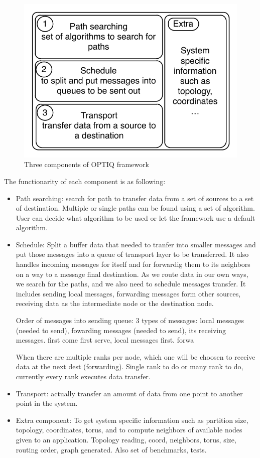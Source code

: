 \begin{figure}[!htb]
\vspace{-0.1in}
\centering
\includegraphics[scale=0.7]{figures/framework.pdf}
\vspace{-0.2in}
\caption{Three components of OPTIQ framework}
\vspace{-0.1in}
\label{fig:framework}
\end{figure}

The functionarity of each component is as following:
\begin{itemize}
\item Path searching: search for path to transfer data from a set of sources to a set of destination. Multiple or single paths can be found using a set of algorithm. User can decide what algorithm to be used or let the framework use a default algorithm.
\item Schedule: Split a buffer data that needed to tranfer into smaller messages and put those messages into a queue of transport layer to be transferred. It also handles incoming messages for itself and for forwardig them to its neighbors on a way to a message final destination.
As we route data in our own ways, we search for the paths, and we also need to schedule messages transfer. It includes sending local messages, forwarding messages form other sources, receiving data as the intermediate node or the destination node.

Order of messages into sending queue: 3 types of messages: local messages (needed to send), fowarding messages (needed to send), its receiving messages. first come first serve, local messages first. forwa

When there are multiple ranks per node, which one will be choosen to receive data at the next dest (forwarding). Single rank to do or many rank to do, currently every rank executes data transfer.

\item Transport: actually transfer an amount of data from one point to another point in the system.
\item Extra component: To get system specific information such as partition size, topology, coordinates, torus, and to compute neighbors of available nodes given to an application. Topology reading, coord, neighbors, torus, size, routing order, graph generated. Also set of benchmarks, tests.
\end{itemize}
